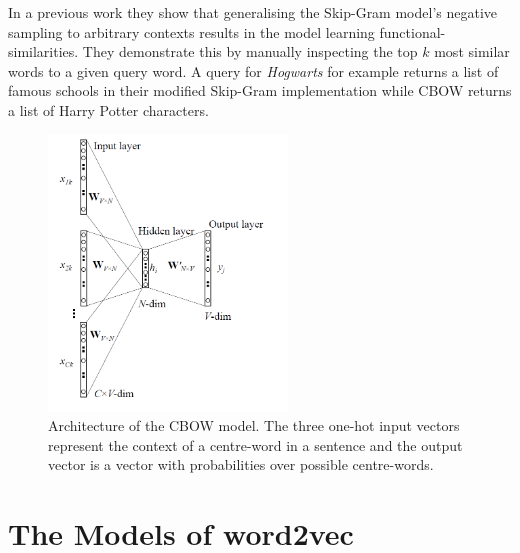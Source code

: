 \documentclass[conference]{IEEEtran}
\begin{document}
In a previous work \cite{levy2014dependency} they show that generalising the Skip-Gram 
model's negative sampling to arbitrary contexts results in the model learning 
functional-similarities. They demonstrate this by manually inspecting the top $k$ most 
similar words to a given query word. A query for  \textit{Hogwarts} for example returns 
a list of famous schools in their modified Skip-Gram implementation while CBOW returns 
a list of Harry Potter characters.

\begin{figure}[t]
\centering
\includegraphics[width=2.5in]{cbow}
\caption{Architecture of the CBOW model. The three one-hot input vectors represent the context 
of a centre-word in a sentence and the output vector is a vector with probabilities over possible 
centre-words. }
\label{fig:cbow}
\end{figure}

\section{The Models of word2vec}
\label{sec:model}
\end{document}
